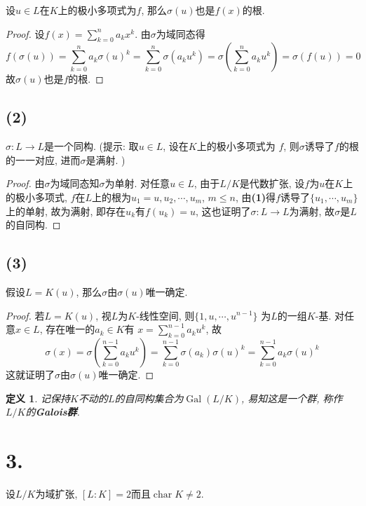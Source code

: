 \documentclass[12pt, a4paper, fontset=windows]{ctexart}
\newcommand{\Gal}{\operatorname{Gal}}
\newcommand{\ch}{\operatorname{char}}
\newtheorem*{definition}{定义}
\begin{document}
设$u\in L$在$K$上的极小多项式为$f$, 那么$\sigma(u)$也是$f(x)$的根. 

\begin{proof}
设$f(x)=\sum^n_{k=0}a_kx^k$. 由$\sigma$为域同态得
\[f(\sigma(u))=\sum^n_{k=0}a_k\sigma(u)^k=\sum^n_{k=0}\sigma(a_ku^k)=\sigma(\sum^n_{k=0}a_ku^k)=\sigma(f(u))=0\]
故$\sigma(u)$也是$f$的根. 
\end{proof}

\subsection*{(2)}

$\sigma:L\to L$是一个同构. (提示: 取$u\in L$, 设在$K$上的极小多项式为
$f$, 则$\sigma$诱导了$f$的根的一一对应, 进而$\sigma$是满射. )

\begin{proof}
由$\sigma$为域同态知$\sigma$为单射. 对任意$u\in L$, 由于$L/K$是代数扩张, 
设$f$为$u$在$K$上的极小多项式, $f$在$L$上的根为$u_1=u,u_2,\cdots,u_m$, 
$m\le n$, 由{\bf (1)}得$f$诱导了$\{u_1,\cdots,u_m\}$上的单射, 
故为满射, 即存在$u_k$有$f(u_k)=u$, 这也证明了$\sigma:L\to L$为满射, 
故$\sigma$是$L$的自同构. 
\end{proof}

\subsection*{(3)}

假设$L=K(u)$, 那么$\sigma$由$\sigma(u)$唯一确定. 

\begin{proof}
若$L=K(u)$, 视$L$为$K$-线性空间, 则$\{1,u,\cdots,u^{n-1}\}$
为$L$的一组$K$-基. 对任意$x\in L$, 存在唯一的$a_k\in K$有
$x=\sum^{n-1}_{k=0}a_ku^k$, 故
\[\sigma(x)=\sigma(\sum^{n-1}_{k=0}a_ku^k)=\sum^{n-1}_{k=0}\sigma(a_k)\sigma(u)^k=\sum^{n-1}_{k=0}a_k\sigma(u)^k\]
这就证明了$\sigma$由$\sigma(u)$唯一确定. 
\end{proof}

\begin{definition}
记保持$K$不动的$L$的自同构集合为$\Gal(L/K)$, 
易知这是一个群, 称作$L/K$的{\bf Galois群}. 
\end{definition}

\section*{3.}

设$L/K$为域扩张, $[L:K]=2$而且$\ch K\ne 2$. 
\end{document}
